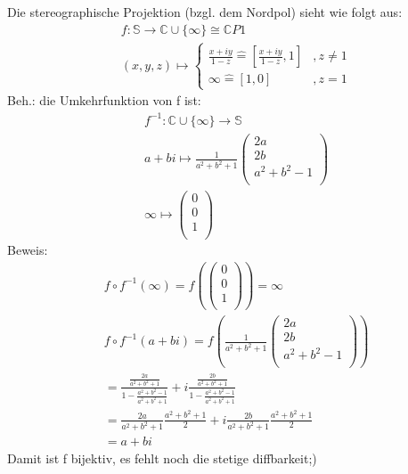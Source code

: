 \section{}
	Die stereographische Projektion (bzgl. dem Nordpol) sieht wie folgt aus:
	\begin{align}
		&f:\mathbb{S}\longrightarrow \mathbb{C} \cup \{ \infty \}\cong\mathbb{C}P1\\
		&(x,y,z)\longmapsto 
		\begin{cases}
            \frac{x+iy}{1-z} \widehat{=}\left[\frac{x+iy}{1-z},1\right] &,z \neq 1\\
            \infty \widehat{=}\left[1,0\right]	&,z = 1
        \end{cases}
	\end{align}
	Beh.: die Umkehrfunktion von f ist:
	\begin{align}
		&f^{-1}: \mathbb{C} \cup \{ \infty \}\longrightarrow \mathbb{S}\\
		&a+bi \longmapsto \frac{1}{a^2+b^2+1}\left( \begin{array}{c} 2a \\ 2b \\ a^2+b^2-1 \\ \end{array}\right)\\
		&\infty \longmapsto \left( \begin{array}{c} 0 \\ 0 \\ 1 \\ \end{array}\right)
	\end{align}
	Beweis:
	\begin{align}
		&f \circ f^{-1}(\infty) = f(\left( \begin{array}{c} 0 \\ 0 \\ 1 \\ \end{array}\right))=\infty \\
		&f \circ f^{-1}(a+bi)=f(\frac{1}{a^2+b^2+1}\left( \begin{array}{c} 2a \\ 2b \\ a^2+b^2-1 \\ \end{array}\right) )\\
		&=\frac{\frac{2a}{a^2+b^2+1}}{1-\frac{a^2+b^2-1}{a^2+b^2+1}}+i\frac{\frac{2b}{a^2+b^2+1}}{1-\frac{a^2+b^2-1}{a^2+b^2+1}}\\
		&=\frac{2a}{a^2+b^2+1}\frac{a^2+b^2+1}{2}+i\frac{2b}{a^2+b^2+1}\frac{a^2+b^2+1}{2}\\
		&=a+bi
	\end{align}
	Damit ist f bijektiv, es fehlt noch die stetige diffbarkeit;)